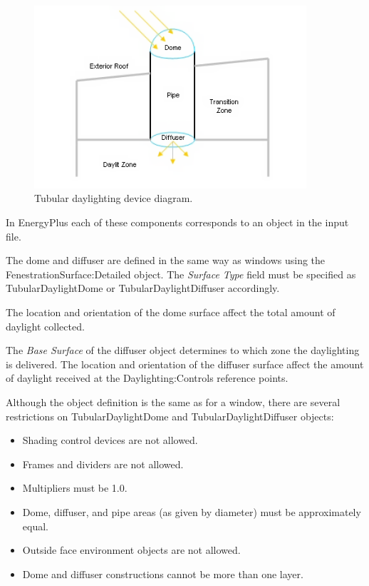 \begin{figure}[hbtp] %
\centering
\includegraphics[width=0.9\textwidth, height=0.9\textheight, keepaspectratio=true]{media/image108.png}
\caption{Tubular daylighting device diagram. \protect \label{fig:tubular-daylighting-device-diagram.}}
\end{figure}

In EnergyPlus each of these components corresponds to an object in the input file.

The dome and diffuser are defined in the same way as windows using the FenestrationSurface:Detailed object. The \emph{Surface Type} field must be specified as TubularDaylightDome or TubularDaylightDiffuser accordingly.

The location and orientation of the dome surface affect the total amount of daylight collected.

The \emph{Base Surface} of the diffuser object determines to which zone the daylighting is delivered. The location and orientation of the diffuser surface affect the amount of daylight received at the Daylighting:Controls reference points.

Although the object definition is the same as for a window, there are several restrictions on TubularDaylightDome and TubularDaylightDiffuser objects:

\begin{itemize}
\item
  Shading control devices are not allowed.
\item
  Frames and dividers are not allowed.
\item
  Multipliers must be 1.0.
\item
  Dome, diffuser, and pipe areas (as given by diameter) must be approximately equal.
\item
  Outside face environment objects are not allowed.
\item
  Dome and diffuser constructions cannot be more than one layer.
\end{itemize}

